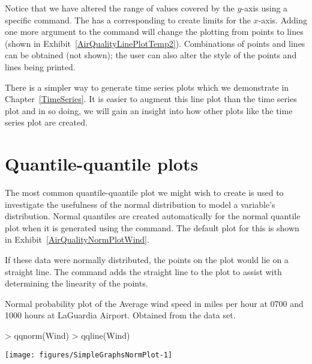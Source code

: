 Notice that we have altered the range of values covered by the $y$-axis using a specific command. The  has a corresponding  to create limits for the $x$-axis. Adding one more argument to the  command will change the plotting from points to lines (shown in Exhibit~\ref{AirQualityLinePlotTemp2}). Combinations of points and lines can be obtained (not shown); the user can also alter the style of the points and lines being printed. 
 
There is a simpler way to generate time series plots which we demonstrate in Chapter~\ref{TimeSeries}. It is easier to augment this line plot than the time series plot and in so doing, we will gain an insight into how other plots like the time series plot are created. 
 
 
\section{Quantile-quantile plots} 
 
The most common quantile-quantile plot we might wish to create is used to investigate the usefulness of the normal distribution to model a variable's distribution. Normal quantiles are created automatically for the normal quantile plot when it is generated using the  command. The default plot for this is shown in Exhibit~\ref{AirQualityNormPlotWind}. 
 
If these data were normally distributed, the points on the plot would lie on a straight line. The  command adds the straight line to the plot to assist with determining the linearity of the points. 
 
\begin{exhibit} 
\begin{center} 
\caption{Normal probability plot of the Average wind speed in miles per hour at 0700 and 1000 hours at LaGuardia Airport. Obtained from the  data set.} 
\label{AirQualityNormPlotWind} 

\begin{Schunk}
\begin{Sinput}
> qqnorm(Wind) 
> qqline(Wind) 
\end{Sinput}

\texttt{[image: figures/SimpleGraphsNormPlot-1]} \end{Schunk}

\end{center} 
\end{exhibit} 
 
